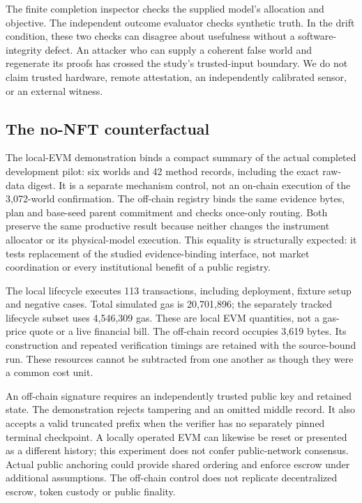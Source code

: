 The finite completion inspector checks the supplied model's allocation and objective. The independent outcome evaluator checks synthetic truth. In the drift condition, these two checks can disagree about usefulness without a software-integrity defect. An attacker who can supply a coherent false world and regenerate its proofs has crossed the study's trusted-input boundary. We do not claim trusted hardware, remote attestation, an independently calibrated sensor, or an external witness.

\subsection{The no-NFT counterfactual}
The local-EVM demonstration binds a compact summary of the actual completed development pilot: six worlds and 42 method records, including the exact raw-data digest. It is a separate mechanism control, not an on-chain execution of the 3,072-world confirmation. The off-chain registry binds the same evidence bytes, plan and base-seed parent commitment and checks once-only routing. Both preserve the same productive result because neither changes the instrument allocator or its physical-model execution. This equality is structurally expected: it tests replacement of the studied evidence-binding interface, not market coordination or every institutional benefit of a public registry.

The local lifecycle executes 113 transactions, including deployment, fixture setup and negative cases. Total simulated gas is 20,701,896; the separately tracked lifecycle subset uses 4,546,309 gas. These are local EVM quantities, not a gas-price quote or a live financial bill. The off-chain record occupies 3,619 bytes. Its construction and repeated verification timings are retained with the source-bound run. These resources cannot be subtracted from one another as though they were a common cost unit.

An off-chain signature requires an independently trusted public key and retained state. The demonstration rejects tampering and an omitted middle record. It also accepts a valid truncated prefix when the verifier has no separately pinned terminal checkpoint. A locally operated EVM can likewise be reset or presented as a different history; this experiment does not confer public-network consensus. Actual public anchoring could provide shared ordering and enforce escrow under additional assumptions. The off-chain control does not replicate decentralized escrow, token custody or public finality.

